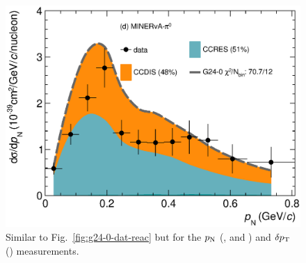 \begin{figure}
    \includegraphics[width=\dbfigwid\textwidth]{figures/tuning/0000-min_pi0_pn_reac_decomp.eps}
    \caption{\label{fig:g24-0-pn-reac} Similar to Fig.~\ref{fig:g24-0-dat-reac} but for the $p_\textrm{N}$ (\ttkpip, \minzpi and \minpiz) and $\delta p_\textrm{T}$ (\ttkzpi) measurements.
    } 
\end{figure}

